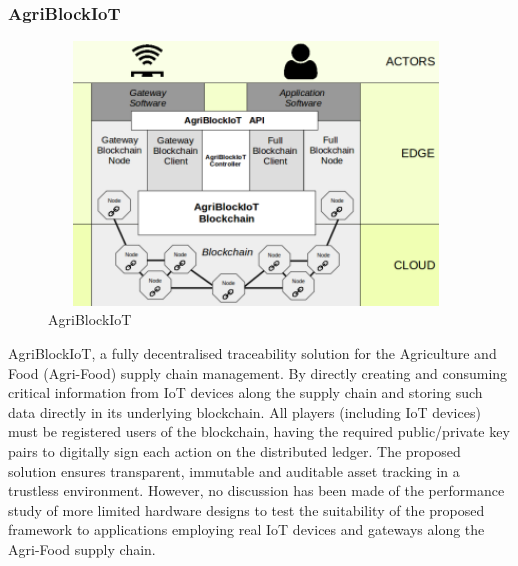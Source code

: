 \documentclass[12pt,a4paper,twocolumn,fleqn]{article}
\begin{document}
\subsubsection{AgriBlockIoT}
\begin{figure} [H]
\includegraphics[width=11cm,height=7cm]{media/AgriBlockIoT.png}
\centering
\caption{AgriBlockIoT}
\end{figure}
AgriBlockIoT, a fully decentralised traceability solution for the Agriculture and Food (Agri-Food) supply chain management. By directly creating and consuming critical information from IoT devices along the supply chain and storing such data directly in its underlying blockchain. All players (including IoT devices) must be registered users of the blockchain, having the required public/private key pairs to digitally sign each action on the distributed ledger. The proposed solution ensures transparent, immutable and auditable asset tracking in a trustless environment. However, no discussion has been made of the performance study of more limited hardware designs to test the suitability of the proposed framework to applications employing real IoT devices and gateways along the Agri-Food supply chain. \\
\end{document}
